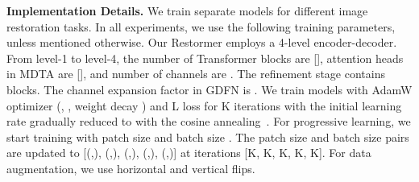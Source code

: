 \documentclass[10pt,twocolumn,letterpaper]{article}
\def\xnet{Restormer\xspace}
\begin{document}
\noindent\textbf{Implementation Details.}
We train separate models for different image restoration tasks. 
In all experiments, we use the following training parameters, unless mentioned otherwise. Our \xnet employs a 4-level encoder-decoder.
From level-1 to level-4, the number of Transformer blocks are [], attention heads in MDTA are [], and number of channels are . 
The refinement stage contains  blocks. The channel expansion factor in GDFN is . 
We train models with AdamW optimizer (, , weight decay ) and L loss for K iterations with the initial learning rate   gradually reduced to  with the cosine annealing~\cite{loshchilov2016sgdr}.
For progressive learning, we start training with patch size  and batch size . 
The patch size and batch size pairs are updated to [(,), (,), (,), (,), (,)] at iterations [K, K, K, K, K]. For data augmentation, we use horizontal and vertical flips.
\end{document}
